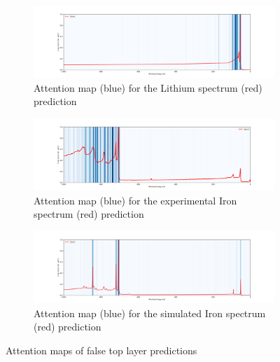 \begin{figure}[H]

    \begin{subfigure}[b]{1\textwidth}
            \includegraphics[width=\textwidth]{Figures/attention_map_Li.png}
            \caption{Attention map (blue) for the Lithium spectrum (red) prediction}
            \label{att:dy}
    \end{subfigure}
    \begin{subfigure}[b]{1\textwidth}
            \includegraphics[width=\textwidth]{Figures/attention_map_Fe.png}
            \caption{Attention map (blue) for the experimental Iron spectrum (red) prediction}
            \label{att:c}
    \end{subfigure}
    
    \begin{subfigure}[b]{1\textwidth}
            \includegraphics[width=\textwidth]{Figures/attention_map_Fe_Training.png}
            \caption{Attention map (blue) for the simulated Iron spectrum (red) prediction}
            \label{att:c}
    \end{subfigure}
\caption{Attention maps of false top layer predictions}
\end{figure}


